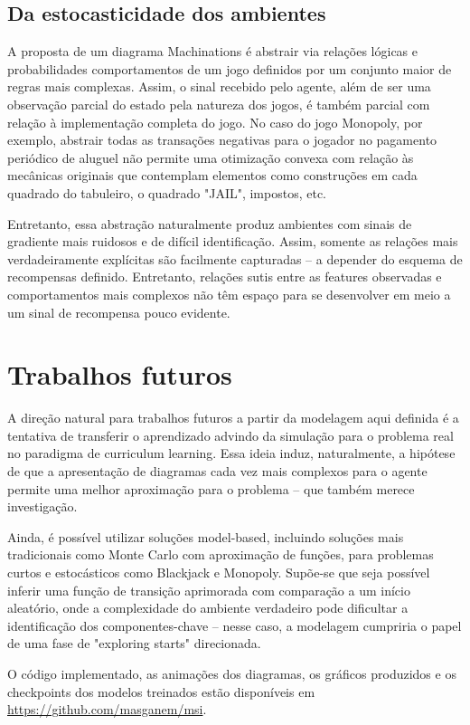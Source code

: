 \documentclass[conference]{IEEEtran}
\begin{document}
\subsection{Da estocasticidade dos ambientes}
A proposta de um diagrama Machinations é abstrair via relações lógicas e probabilidades comportamentos de um jogo definidos por um conjunto maior de regras mais complexas. Assim, o sinal recebido pelo agente, além de ser uma observação parcial do estado pela natureza dos jogos, é também parcial com relação à implementação completa do jogo. No caso do jogo Monopoly, por exemplo, abstrair todas as transações negativas para o jogador no pagamento periódico de aluguel não permite uma otimização convexa com relação às mecânicas originais que contemplam elementos como construções em cada quadrado do tabuleiro, o quadrado "JAIL", impostos, etc.

Entretanto, essa abstração naturalmente produz ambientes com sinais de gradiente mais ruidosos e de difícil identificação. Assim, somente as relações mais verdadeiramente explícitas são facilmente capturadas -- a depender do esquema de recompensas definido. Entretanto, relações sutis entre as features observadas e comportamentos mais complexos não têm espaço para se desenvolver em meio a um sinal de recompensa pouco evidente.

\section{Trabalhos futuros}
\label{future-work}
A direção natural para trabalhos futuros a partir da modelagem aqui definida é a tentativa de transferir o aprendizado advindo da simulação para o problema real no paradigma de curriculum learning\cite{curriculum}. Essa ideia induz, naturalmente, a hipótese de que a apresentação de diagramas cada vez mais complexos para o agente permite uma melhor aproximação para o problema -- que também merece investigação.

Ainda, é possível utilizar soluções model-based,  incluindo soluções mais tradicionais como Monte Carlo com aproximação de funções, para problemas curtos e estocásticos como Blackjack e Monopoly. Supõe-se que seja possível inferir uma função de transição aprimorada com comparação a um início aleatório, onde a complexidade do ambiente verdadeiro pode dificultar a identificação dos componentes-chave -- nesse caso, a modelagem cumpriria o papel de uma fase de "exploring starts" direcionada.

\vfill
\small O código implementado, as animações dos diagramas, os gráficos produzidos e os checkpoints dos modelos treinados estão disponíveis em \url{https://github.com/masganem/msi}. 
\newpage


\end{document}
